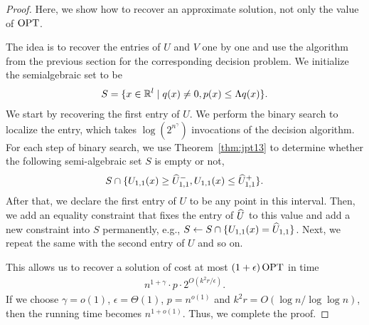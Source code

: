 \begin{proof}

Here, we show how to recover an approximate solution, not only the value of $\operatorname{OPT}$.

The idea is to recover the entries of $U$ and $V$ one by one and use the algorithm from the previous section for the corresponding decision problem. We initialize the semialgebraic set to be
\begin{align*}
    S= \{x \in \mathbb{R}^l \mid q(x) \neq 0, p(x) \leq \Lambda q(x) \}.
\end{align*}
We start by recovering the first entry of $U$. We perform the binary search to localize the entry, which takes $ \log  ( 2^{n^{\gamma}} )$ invocations of the decision algorithm. For each step of binary search, we use Theorem~\ref{thm:jpt13} to determine whether the following semi-algebraic set $S$ is empty or not,
\begin{align*}
S \cap \{U_{1,1}(x) \geq \widehat{U}_{1,1}^{-}, U_{1,1}(x) \leq \widehat{U}_{1,1}^{+} \}.
\end{align*}
After that, we declare the first entry of $U$ to be any point in this interval.  Then, we add an equality constraint that fixes the entry of $\widehat{U}$ to this value and add a new constraint into $S$ permanently, e.g., $S  \leftarrow S \cap \{U_{1,1}(x)=\widehat{U}_{1,1} \}$. Next, we repeat the same with the second entry of $U$ and so on.

This allows us to recover a solution of cost at most $(1+ \epsilon) \operatorname{OPT}$ in time
\begin{align*}
n^{1+\gamma} \cdot p \cdot 2^{O (k^{2} r / \epsilon )} .
\end{align*}
If we choose $\gamma = o(1)$, $\epsilon = \Theta(1)$, $p =n^{o(1)}$ and $k^2 r = O(\log n / \log\log n )$, then the running time becomes $n^{1+o(1)}$.
Thus, we complete the proof.
\end{proof}

